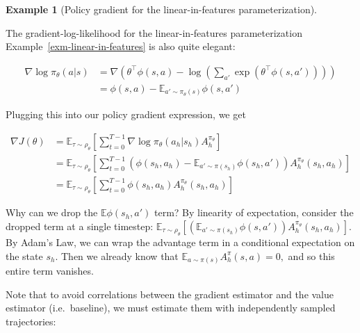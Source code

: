 \documentclass[
  letterpaper,
  DIV=11,
  numbers=noendperiod]{scrreprt}
\theoremstyle{plain}
\theoremstyle{plain}
\theoremstyle{definition}
\newtheorem{example}{Example}[chapter]
\theoremstyle{definition}
\theoremstyle{remark}
\begin{document}
\begin{example}[Policy gradient for the linear-in-features
parameterization]\protect\hypertarget{exm-linear-policy-grad}{}\label{exm-linear-policy-grad}

The gradient-log-likelihood for the linear-in-features parameterization
Example~\ref{exm-linear-in-features} is also quite elegant:

\[
\begin{aligned}
        \nabla \log \pi_\theta(a|s) &= \nabla \left( \theta^\top \phi(s, a) - \log \left( \sum_{a'} \exp(\theta^\top \phi(s, a')) \right) \right) \\
        &= \phi(s, a) - \mathbb{E}_{a' \sim \pi_\theta(s)} \phi(s, a')
\end{aligned}
\]

Plugging this into our policy gradient expression, we get

\[\begin{aligned}
    \nabla J(\theta) & = \mathbb{E}_{\tau \sim \rho_\theta} \left[
    \sum_{t=0}^{T-1} \nabla \log \pi_\theta(a_h| s_h) A_h^{\pi_\theta}
    \right]                                                                                                                    \\
                     & = \mathbb{E}_{\tau \sim \rho_\theta} \left[
    \sum_{t=0}^{T-1} \left( \phi(s_h, a_h) - \mathbb{E}_{a' \sim \pi(s_h)} \phi(s_h, a') \right) A_h^{\pi_\theta}(s_h, a_h)
    \right]                                                                                                                    \\
                     & = \mathbb{E}_{\tau \sim \rho_\theta} \left[ \sum_{t=0}^{T-1} \phi(s_h, a_h) A_h^{\pi_\theta} (s_h, a_h) \right]
\end{aligned}
\]

Why can we drop the \(\mathbb{E}\phi(s_h, a')\) term? By linearity of
expectation, consider the dropped term at a single timestep:
\(\mathbb{E}_{\tau \sim \rho_\theta} \left[ \left( \mathbb{E}_{a' \sim \pi(s_h)} \phi(s, a') \right) A_h^{\pi_\theta}(s_h, a_h) \right].\)
By Adam's Law, we can wrap the advantage term in a conditional
expectation on the state \(s_h.\) Then we already know that
\(\mathbb{E}_{a \sim \pi(s)} A_h^{\pi}(s, a) = 0,\) and so this entire
term vanishes.

\end{example}

Note that to avoid correlations between the gradient estimator and the
value estimator (i.e.~baseline), we must estimate them with
independently sampled trajectories:
\end{document}
